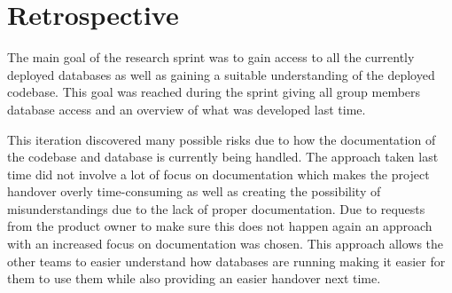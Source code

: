 \section{Retrospective}
The main goal of the research sprint was to gain access to all the currently deployed databases as well 
as gaining a suitable understanding of the deployed codebase. This goal was reached during the sprint 
giving all group members database access and an overview of what was developed last time. %

This iteration discovered many possible risks due to how the documentation of the codebase and database is 
currently being handled. The approach taken last time did not involve a lot of focus on documentation 
which makes the project handover overly time-consuming as well as creating the possibility of 
misunderstandings due to the lack of proper documentation. Due to requests from the product owner to make 
sure this does not happen again an approach with an increased focus on documentation was chosen. This 
approach allows the other teams to easier understand how databases are running making it easier for 
them to use them while also providing an easier handover next time.  


